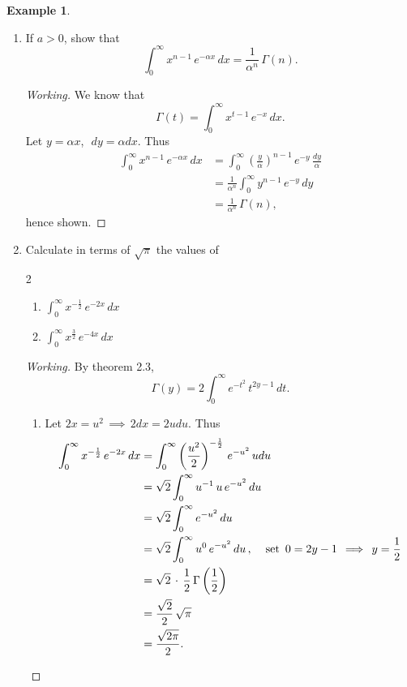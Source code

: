 \documentclass[12pt,a4paper]{report}
\theoremstyle{definition}
\newtheorem{exa}[thm]{Example}
\theoremstyle{plain}
\begin{document}
\begin{exa}\textbf{}
\vspace*{-5mm}
\begin{enumerate}
\item[(a).] If $a > 0$, show that $$\int^{\infty}_0x^{n-1}\, e^{-\alpha x}\, dx = \frac{1}{\alpha^n}\, \Gamma(n).$$
\begin{proof}[Working]
We know that $$\Gamma(t) = \int^{\infty}_0x^{t-1}\, e^{-x}\, dx.$$
Let $y = \alpha x$, $\,\, dy = \alpha dx$. Thus 
\begin{align*}
\int_0^{\infty} x^{n-1}\, e^{-\alpha x}\, dx & = \int_0^{\infty}\left(\frac{y}{\alpha}\right)^{n-1}\, e^{-y}\, \frac{dy}{\alpha}\\ 
& = \frac{1}{\alpha^n}\int_0^{\infty}y^{n-1}\, e^{-y}\, dy\\
& = \frac{1}{\alpha^n}\, \Gamma(n),
\end{align*}
hence shown.
\end{proof}



\item[(b).] Calculate in terms of $\sqrt{\pi}$ the values of 
\begin{multicols}{2}
\begin{enumerate}
\item[(i).] $\displaystyle{\int^{\infty}_0x^{-\frac{1}{2}}\, e^{-2x}\, dx}$
\item[(ii).] $\displaystyle{\int_0^{\infty}x^{\frac{3}{2}}\, e^{-4x}\, dx}$
\end{enumerate}
\end{multicols}

\begin{proof}[Working]
By theorem 2.3,
$$\Gamma(y) = 2\int_0^{\infty} e^{-t^2}\, t^{2y-1}\, dt.$$
\begin{enumerate}
\item[(i).] Let $2x = u^2\, \implies\, 2dx = 2udu$. Thus
\begin{align*}
\int_0^{\infty}x^{-\frac{1}{2}}\, e^{-2x}\, dx & = \int_0^{\infty} \left(\frac{u^2}{2}\right)^{-\frac{1}{2}}\, e^{-u^2}\, udu\\
& = \sqrt{2}\int_0^{\infty} u^{-1}\, u\, e^{-u^2}\, du\\
& = \sqrt{2}\int_0^{\infty} e^{-u^2}\, du\\
& = \sqrt{2}\int_0^{\infty} u^0\, e^{-u^2}\, du\, , \hspace{0.4cm}\text{set}\,\,\, 0 = 2y - 1\, \implies\, y = \frac{1}{2}\\
& = \sqrt{2}\, \cdot\, \frac{1}{2}\, \Gamma\left(\frac{1}{2}\right)\\
& = \frac{\sqrt{2}}{2}\, \sqrt{\pi}\\
& = \frac{\sqrt{2\pi}}{2}.
\end{align*}



\end{enumerate}
\end{proof}
\end{enumerate}
\end{exa}
\end{document}
